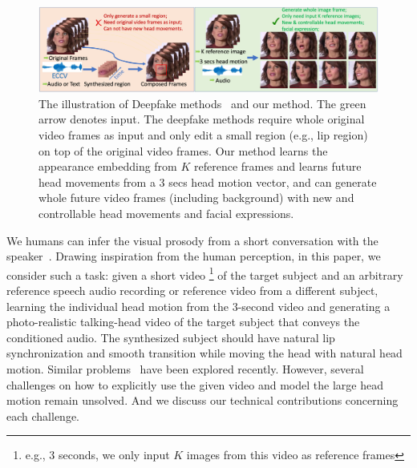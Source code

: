 \documentclass[runningheads]{llncs}
\begin{document}
\begin{figure}[t]
\includegraphics[width= \linewidth]{latex/images/teaser.png}
\caption{The illustration of Deepfake methods~\cite{suwajanakorn2017synthesizing,fried2019text} and our method. The green arrow denotes input. The deepfake methods require whole original video frames as input and only edit a small region (e.g., lip region) on top of the original video frames. Our method learns the appearance embedding from $K$ reference frames and learns future head movements from a 3 secs head motion vector, and can generate whole future video frames (including background) with new and controllable head movements and facial expressions.}
\label{fig:teaser}
\end{figure}

We humans can infer the visual prosody from a short conversation with the speaker~\cite{munhall2004visual}. Drawing inspiration from the human perception, in this paper, we consider such a task: given a short video \footnote{e.g., 3 seconds, we only input $K$ images from this video as reference frames} of the target subject and an arbitrary reference speech audio recording or reference video from a different subject, learning the individual head motion from the 3-second video and generating a photo-realistic talking-head video of the target subject that conveys the conditioned audio. The synthesized subject should have natural lip synchronization and smooth transition while moving the head with natural head motion. Similar problems~\cite{chung2017you,zhou2019talking,ijcai2019-129,vougioukas2019realistic,chen2019hierarchical,wiles2018x2face,zakharov2019few,wang2018fewshotvid2vid} have been explored recently. However, several challenges on how to explicitly use the given video and model the large head motion remain unsolved. And we discuss our technical contributions concerning each challenge.

\end{document}
